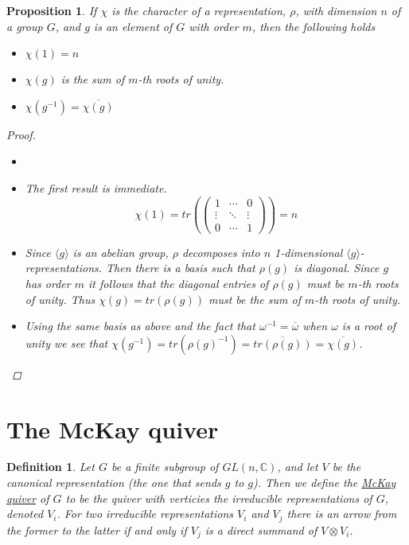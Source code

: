 \documentclass[11pt, a4paper, english]{article}
\newtheorem{prop}{Proposition}
\numberwithin{prop}{section}
\numberwithin{lemma}{section}
\numberwithin{theorem}{section}
\newtheorem{defin}{Definition}
\numberwithin{defin}{section}
\numberwithin{example}{section}
\newcommand{\C}{\mathbb{C}}
\begin{document}
\begin{prop}
If $\chi$ is the character of a representation, $\rho$, with dimension $n$ of a group $G$, and $g$ is an element of $G$ with order $m$, then the following holds
\begin{itemize}
 \item[(1)] $\chi(1) = n$
 \item[(2)] $\chi(g)$ is the sum of $m$-th roots of unity.
 \item[(3)] $\chi(g^{-1}) = \overline{\chi(g)}$
\end{itemize}
\begin{proof}

\begin{itemize}
\item[]
\item[(1)]
The first result is immediate.
$$\chi(1) = tr\left(\begin{pmatrix}
1 & \cdots & 0\\
\vdots & \ddots & \vdots\\
0 & \cdots & 1
\end{pmatrix}\right) = n$$
\item[(2)]
Since $\langle g \rangle$ is an abelian group, $\rho$ decomposes into $n$ 1-dimensional $\langle g \rangle$-representations. Then there is a basis such that $\rho(g)$ is diagonal. Since $g$ has order $m$ it follows that the diagonal entries of $\rho(g)$ must be $m$-th roots of unity. Thus $\chi(g) = tr(\rho(g))$ must be the sum of $m$-th roots of unity.
\item[(3)]
Using the same basis as above and the fact that $\omega^{-1} = \overline{\omega}$ when $\omega$ is a root of unity we see that $\chi(g^{-1}) = tr(\rho(g)^{-1}) = \overline{tr(\rho(g))} = \overline{\chi(g)}$.
\end{itemize}
\end{proof}
\end{prop}

\fi

\section{The McKay quiver}
\begin{defin}
Let $G$ be a finite subgroup of $GL(n, \C)$, and let $V$ be the canonical representation (the one that sends $g$ to $g$). Then we define the \underline{McKay quiver} of $G$ to be the quiver with verticies the irreducible representations of $G$, denoted $V_i$. For two irreducible representations $V_i$ and $V_j$ there is an arrow from the former to the latter if and only if $V_j$ is a direct summand of $V \otimes V_i$. 
\end{defin}
\end{document}
